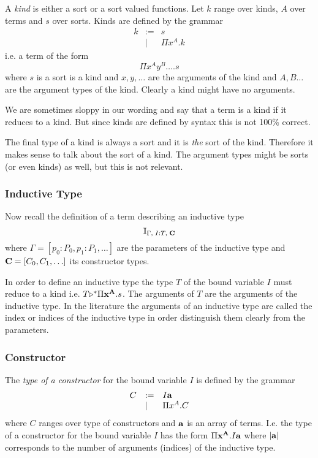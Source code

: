 \begin{definition}
  A \emph{kind} is either a sort or a sort valued functions. Let $k$ range
  over kinds, $A$ over terms and $s$ over sorts. Kinds are defined by the
  grammar
  $$
  \begin{array}{lll}
    k
    &:=& s
    \\
    &\mid& \Pi x^A. k
  \end{array}
  $$
  i.e. a term of the form
  $$
  \Pi x^A y^B \ldots . s
  $$
  where $s$ is a sort is a kind and $x, y, \ldots$ are the arguments of the
  kind and $A, B \ldots$ are the argument types of the kind. Clearly a kind
  might have no arguments.

  We are sometimes sloppy in our wording and say that a term is a kind if it
  reduces to a kind. But since kinds are defined by syntax this is not 100\%
  correct.

  The final type of a kind is always a sort and it is \emph{the} sort of the
  kind. Therefore it makes sense to talk about the sort of a kind. The
  argument types might be sorts (or even kinds) as well, but this is not
  relevant.
\end{definition}



\subsubsection{Inductive Type}

Now recall the definition of a term describing an inductive type
$$
\mathbb{I}_{\Gamma, \; I:T, \; \mathbf{C}}
$$
where $\Gamma = [p_0:P_0, p_1: P_1, \ldots]$ are the parameters of the
inductive type and $\mathbf{C} = [C_0, C_1, \ldots]$ its constructor types.

In order to define an inductive type the type $T$ of the bound variable $I$
must reduce to a kind i.e. $T {\mathrel{\triangleright}}^* \Pi \mathbf{x}^{\mathbf{A}}. s$. The arguments
of $T$ are the arguments of the inductive type. In the literature the
arguments of an inductive type are called the index or indices of the
inductive type in order distinguish them clearly from the parameters.


\subsubsection{Constructor}

\begin{definition}
  The \emph{type of a constructor} for the bound variable $I$ is defined by
  the grammar
  $$
  \begin{array}{lll}
    C
    &:= & I \mathbf{a}
    \\
    &\mid& \Pi x^A . C
  \end{array}
  $$
  where $C$ ranges over type of constructors and $\mathbf{a}$ is an array of
  terms. I.e. the type of a constructor for the bound variable $I$ has the
  form $\Pi \mathbf{x}^{\mathbf{A}}. I \mathbf{a}$ where $|\mathbf{a}|$ corresponds to the
  number of arguments (indices) of the inductive type.
\end{definition}

